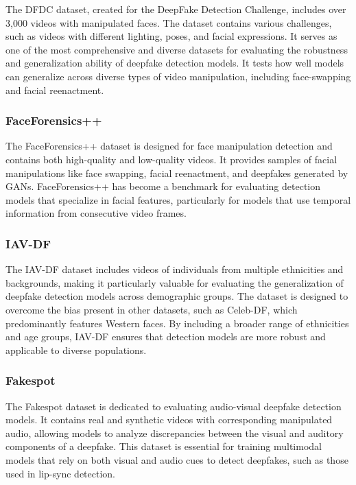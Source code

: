 \documentclass[lettersize,journal]{IEEEtran}
\begin{document}
The DFDC dataset, created for the DeepFake Detection Challenge, includes over 3,000 videos with manipulated faces. The dataset contains various challenges, such as videos with different lighting, poses, and facial expressions. It serves as one of the most comprehensive and diverse datasets for evaluating the robustness and generalization ability of deepfake detection models. It tests how well models can generalize across diverse types of video manipulation, including face-swapping and facial reenactment.

\subsubsection{ FaceForensics++}

The FaceForensics++ dataset is designed for face manipulation detection and contains both high-quality and low-quality videos. It provides samples of facial manipulations like face swapping, facial reenactment, and deepfakes generated by GANs. FaceForensics++ has become a benchmark for evaluating detection models that specialize in facial features, particularly for models that use temporal information from consecutive video frames.\cite{rathoure2024combating}

\subsubsection{IAV-DF}

The IAV-DF dataset includes videos of individuals from multiple ethnicities and backgrounds, making it particularly valuable for evaluating the generalization of deepfake detection models across demographic groups. The dataset is designed to overcome the bias present in other datasets, such as Celeb-DF, which predominantly features Western faces. By including a broader range of ethnicities and age groups, IAV-DF ensures that detection models are more robust and applicable to diverse populations.\cite{kuang2022dual}

\subsubsection{Fakespot}

The Fakespot dataset is dedicated to evaluating audio-visual deepfake detection models. It contains real and synthetic videos with corresponding manipulated audio, allowing models to analyze discrepancies between the visual and auditory components of a deepfake. This dataset is essential for training multimodal models that rely on both visual and audio cues to detect deepfakes, such as those used in lip-sync detection.
\end{document}

